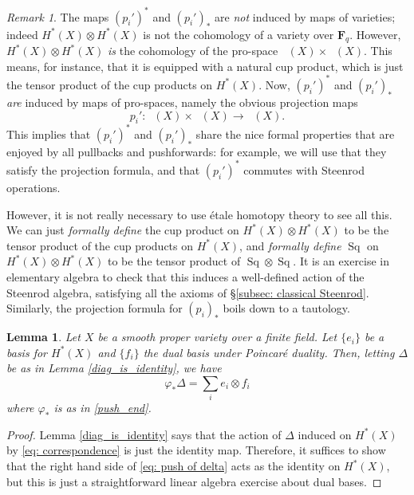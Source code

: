 \documentclass[10pt, reqno]{amsart}
\numberwithin{equation}{subsection}
\newcommand{\F}{\mathbf{F}}
\newcommand{\co}{\colon}
\DeclareMathOperator{\et}{\acute{e}t}
\DeclareMathOperator{\Sq}{Sq}
\DeclareMathOperator{\Et}{\acute{E}t}
\newtheorem{lemma}[thm]{Lemma}
\theoremstyle{remark}
\newtheorem{remark}[thm]{Remark}
\begin{document}
\begin{remark}\label{rem: fake variety}
The maps $(p_i')^*$ and $(p_i')_*$ are \emph{not} induced by maps of varieties; indeed $H^*_{\et}(X) \otimes H^*_{\et}(X)$ is not the cohomology of a variety over $\F_q$. However, $H^*_{\et}(X) \otimes H^*_{\et}(X)$ \emph{is} the cohomology of the pro-space $\Et(X) \times \Et(X) $. This means, for instance, that it is equipped with a natural cup product, which is just the tensor product of the cup products on $H^*_{\et}(X)$. Now, $(p_i')^*$ and $(p_i')_*$ \emph{are} induced by maps of pro-spaces, namely the obvious projection maps 
\[
p_i' \co \Et(X) \times \Et(X) \rightarrow \Et(X).
\]
This implies that $(p_i')^*$ and $(p_i')_*$ share the nice formal properties that are enjoyed by all pullbacks and pushforwards: for example, we will use that they satisfy the projection formula, and that $(p_i')^*$ commutes with Steenrod operations. 

However, it is not really necessary to use \'{e}tale homotopy theory to see all this. We can just \emph{formally define} the cup product on $H^*_{\et}(X) \otimes H^*_{\et}(X)$ to be the tensor product of the cup products on $H^*_{\et}(X)$, and \emph{formally define} $\Sq$ on $H^*_{\et}(X) \otimes H^*_{\et}(X)$ to be the tensor product of $\Sq \otimes \Sq$. It is an exercise in elementary algebra to check that this induces a well-defined action of the Steenrod algebra, satisfying  all the axioms of \S \ref{subsec: classical Steenrod}. Similarly, the projection formula for $(p_i)_*$ boils down to a tautology. 
\end{remark}

\begin{lemma}\label{Delta_basis}
Let $X$ be a smooth proper variety over a finite field. Let $\{e_i\}$ be a basis for $H^*_{\et}(X)$ and $\{f_i\}$ the dual basis under Poincar\'{e} duality. Then, letting $\Delta$ be as in Lemma \ref{diag_is_identity}, we have
\begin{equation}\label{eq: push of delta}
\varphi_* \Delta = \sum_i  e_i \otimes  f_i
\end{equation}
where $\varphi_*$ is as in \eqref{push_end}.
\end{lemma}


\begin{proof}
Lemma \ref{diag_is_identity} says that the action of $\Delta$ induced on $H^*(X)$ by \eqref{eq: correspondence} is just the identity map. Therefore, it suffices to show that the  right hand side of \eqref{eq: push of delta} acts as the identity on $H^*(X)$, but this is just a straightforward linear algebra exercise about dual bases. 
\end{proof}
\end{document}
